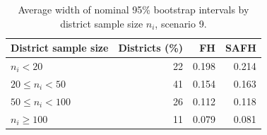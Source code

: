 \begin{table}[t]
\centering
\caption{Average width of nominal 95\% bootstrap intervals by district sample
size $n_i$, scenario 9.}
\label{tab:width}
\begin{tabular}{lrrr}
\toprule
District sample size & Districts (\%) & FH & SAFH \\
\midrule
$n_i < 20$           & 22 & 0.198 & 0.214 \\
$20 \le n_i < 50$    & 41 & 0.154 & 0.163 \\
$50 \le n_i < 100$   & 26 & 0.112 & 0.118 \\
$n_i \ge 100$        & 11 & 0.079 & 0.081 \\
\bottomrule
\end{tabular}
\end{table}
